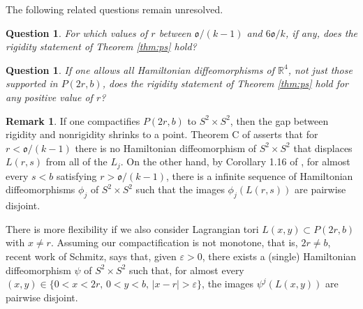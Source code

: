 \documentclass[12pt]{amsart}
\newtheorem{question}[theorem]{Question}
\theoremstyle{definition}
\newtheorem{remark}[theorem]{Remark}
\newcommand{\RR}{{\mathbb R}}
\begin{document}
The following related questions remain unresolved.

\begin{question}
    For which values of $r$ between $\mathfrak{o}/(k-1)$  and $6\mathfrak{o}/k$, if any,  does the rigidity statement of Theorem \ref{thm:ps} hold?
\end{question}

\begin{question}
    If one allows all Hamiltonian diffeomorphisms of $\RR^4$, not just those supported in $P(2r,b)$, does the rigidity statement  of Theorem \ref{thm:ps} hold for any positive value of $r$?
\end{question}

\begin{remark}\label{brendelschmitz}
    If one compactifies $P(2r, b)$ to $S^2 \times S^2$, then the gap between rigidity and nonrigidity shrinks to a point. Theorem C of \cite{ps} asserts that for  $r < \mathfrak{o}/(k-1)$ there is no Hamiltonian diffeomorphism of $S^2 \times S^2$ that displaces $L(r,s)$ from all of the $L_j.$ On the other hand, by Corollary 1.16 of \cite{brki}, for almost every $s<b$ satisfying $r > \mathfrak{o}/(k-1)$,
    there is a infinite sequence of Hamiltonian diffeomorphisms $\phi_j$ of $S^2 \times S^2$ such that the images $\phi_j(L(r,s))$ are pairwise disjoint.

    There is more flexibility if we also consider Lagrangian tori $L(x,y) \subset P(2r,b)$ with $x \neq r$. Assuming our compactification is not monotone, that is, $2r \neq b$, recent work of Schmitz, \cite[Theorem B]{schmitz} says that, given $\varepsilon>0$, there exists a (single) Hamiltonian diffeomorphism $\psi$ of $S^2 \times S^2$ such that, for almost every $(x,y) \in \{0<x<2r, \, 0< y<b, \, |x-r| > \varepsilon \}$, the images $\psi^j(L(x,y))$ are pairwise disjoint.
\end{remark}



\end{document}
